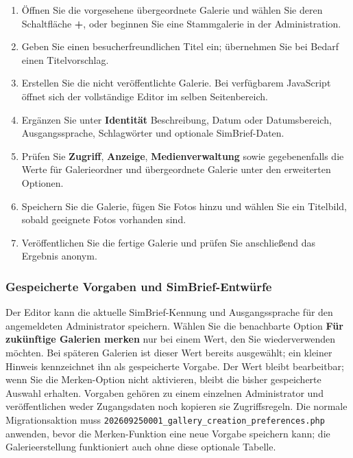 \documentclass[11pt,a4paper]{article}
\newcommand{\ui}[1]{\textbf{#1}}
\newcommand{\codeword}[1]{\nolinkurl{#1}}
\begin{document}
\begin{enumerate}
  \item Öffnen Sie die vorgesehene übergeordnete Galerie und wählen Sie deren
  Schaltfläche \ui{+}, oder beginnen Sie eine Stammgalerie in der
  Administration.
  \item Geben Sie einen besucherfreundlichen Titel ein; übernehmen Sie bei
  Bedarf einen Titelvorschlag.
  \item Erstellen Sie die nicht veröffentlichte Galerie. Bei verfügbarem
  JavaScript öffnet sich der vollständige Editor im selben Seitenbereich.
  \item Ergänzen Sie unter \ui{Identität} Beschreibung, Datum oder
  Datumsbereich, Ausgangssprache, Schlagwörter und optionale SimBrief-Daten.
  \item Prüfen Sie \ui{Zugriff}, \ui{Anzeige}, \ui{Medienverwaltung} sowie
  gegebenenfalls die Werte für Galerieordner und übergeordnete Galerie unter den
  erweiterten Optionen.
  \item Speichern Sie die Galerie, fügen Sie Fotos hinzu und wählen Sie ein
  Titelbild, sobald geeignete Fotos vorhanden sind.
  \item Veröffentlichen Sie die fertige Galerie und prüfen Sie anschließend das
  Ergebnis anonym.
\end{enumerate}

\subsubsection{Gespeicherte Vorgaben und SimBrief-Entwürfe}

Der Editor kann die aktuelle SimBrief-Kennung und Ausgangssprache für den
angemeldeten Administrator speichern. Wählen Sie die benachbarte Option \ui{Für
zukünftige Galerien merken} nur bei einem Wert, den Sie wiederverwenden möchten.
Bei späteren Galerien ist dieser Wert bereits ausgewählt; ein kleiner Hinweis
kennzeichnet ihn als gespeicherte Vorgabe. Der Wert bleibt bearbeitbar; wenn Sie
die Merken-Option nicht aktivieren, bleibt die bisher gespeicherte Auswahl
erhalten. Vorgaben gehören zu einem einzelnen Administrator und veröffentlichen
weder Zugangsdaten noch kopieren sie Zugriffsregeln. Die normale
Migrationsaktion muss
\codeword{202609250001\_gallery\_creation\_preferences.php} anwenden, bevor die
Merken-Funktion eine neue Vorgabe speichern kann; die Galerieerstellung
funktioniert auch ohne diese optionale Tabelle.
\end{document}
